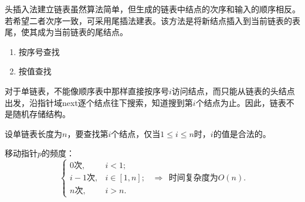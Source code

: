 \begin{frame}
头插入法建立链表虽然算法简单，但生成的链表中结点的次序和输入的顺序相反。若希望二者次序一致，可采用尾插法建表。该方法是将新结点插入到当前链表的表尾，使其成为当前链表的尾结点。
\end{frame}
%
\begin{frame}

\end{frame}

\begin{frame}
\begin{enumerate}
\item 按序号查找
\item 按值查找
\end{enumerate}
\end{frame}
%
\begin{frame}


对于单链表，不能像顺序表中那样直接按序号$i$访问结点，而只能从链表的头结点出发，沿指针域next逐个结点往下搜索，知道搜到第$i$个结点为止。因此，链表不是随机存储结构。

\vspace{0.2in}

设单链表长度为$n$，要查找第$i$个结点，仅当$1\le i \le n$时，$i$的值是合法的。

\end{frame}
%
\begin{frame}[fragile]

\end{frame}

\begin{frame}[fragile]

\end{frame}
%
\begin{frame}[fragile]

\textcolor{acolor5}{移动指针$p$的频度：}
\[\left\{
\begin{array}{rl}
0\mbox{次},& i<1;\\[0.1in]
i-1\mbox{次}, & i  \in [1,n];\\[0.1in]
n\mbox{次}, & i>n.
\end{array}
\right.
~~\Rightarrow~~\mbox{时间复杂度为}O(n).
\] 

\end{frame}


